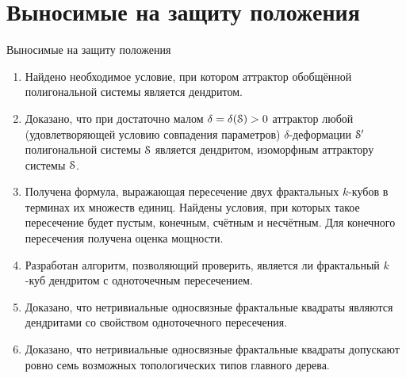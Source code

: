 \documentclass[aspectratio=1610, 10pt, notheorems]{beamer}
\begin{document}
\section{Выносимые на защиту положения} 

\begin{frame}{Выносимые на защиту положения}

{\normalsize
\begin{enumerate}
\item Найдено необходимое условие, при котором аттрактор обобщённой полигональной системы является дендритом.
\item Доказано, что при достаточно малом $\delta=\delta({\EuScript S})>0$ аттрактор любой (удовлетворяющей условию совпадения параметров) $\delta$-деформации ${\EuScript S}'$ полигональной системы ${\EuScript S}$ является дендритом, изоморфным аттрактору системы ${\EuScript S}$.
\item Получена формула, выражающая пересечение двух фрактальных $k$-кубов в терминах их множеств единиц.
Найдены условия, при которых такое пересечение будет пустым, конечным, счётным и несчётным.
Для конечного пересечения получена оценка мощности.
\item Разработан алгоритм, позволяющий проверить, является ли фрактальный $k$-куб дендритом с одноточечным пересечением.
\item Доказано, что нетривиальные односвязные фрактальные квадраты являются дендритами со свойством одноточечного пересечения.
\item Доказано, что нетривиальные односвязные фрактальные квадраты допускают ровно семь возможных топологических типов главного дерева.
\end{enumerate}}
\end{frame}
\end{document}
